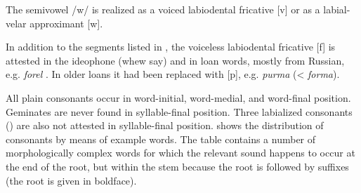 The semivowel /w/ is realized as a voiced labiodental fricative [v] or as a labial-velar approximant [w]. 

In addition to the segments listed in , the voiceless labiodental fricative [f] is attested in the ideophone   (whew say) and in loan words, mostly from Russian, e.g. \textit{forel} . In older loans it had been replaced with [p], e.g. \textit{purma}  (< \textit{forma}).

All plain consonants occur in word-initial, word-medial, and word-final position. Geminates are never found in syllable-final position. Three labialized consonants () are also not attested in syllable-final position.  shows the distribution of consonants by means of example words. The table contains a number of morphologically complex words for which the relevant sound happens to occur at the end of the root, but within the stem because the root is followed by suffixes (the root is given in boldface). 
%

